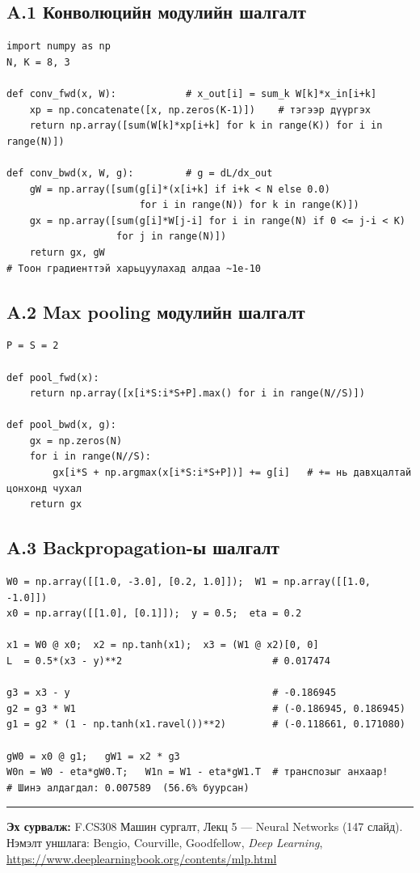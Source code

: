 \documentclass[11pt]{article}
\newenvironment{codebox}
  {\begin{mdframed}[backgroundcolor=gray!8,linewidth=0.4pt]\footnotesize}
  {\end{mdframed}}
\begin{document}
\subsection*{A.1 Конволюцийн модулийн шалгалт}
\begin{codebox}\begin{verbatim}
import numpy as np
N, K = 8, 3

def conv_fwd(x, W):            # x_out[i] = sum_k W[k]*x_in[i+k]
    xp = np.concatenate([x, np.zeros(K-1)])    # тэгээр дүүргэх
    return np.array([sum(W[k]*xp[i+k] for k in range(K)) for i in range(N)])

def conv_bwd(x, W, g):         # g = dL/dx_out
    gW = np.array([sum(g[i]*(x[i+k] if i+k < N else 0.0)
                       for i in range(N)) for k in range(K)])
    gx = np.array([sum(g[i]*W[j-i] for i in range(N) if 0 <= j-i < K)
                   for j in range(N)])
    return gx, gW
# Тоон градиенттэй харьцуулахад алдаа ~1e-10
\end{verbatim}\end{codebox}

\subsection*{A.2 Max pooling модулийн шалгалт}
\begin{codebox}\begin{verbatim}
P = S = 2

def pool_fwd(x):
    return np.array([x[i*S:i*S+P].max() for i in range(N//S)])

def pool_bwd(x, g):
    gx = np.zeros(N)
    for i in range(N//S):
        gx[i*S + np.argmax(x[i*S:i*S+P])] += g[i]   # += нь давхцалтай цонхонд чухал
    return gx
\end{verbatim}\end{codebox}

\subsection*{A.3 Backpropagation-ы шалгалт}
\begin{codebox}\begin{verbatim}
W0 = np.array([[1.0, -3.0], [0.2, 1.0]]);  W1 = np.array([[1.0, -1.0]])
x0 = np.array([[1.0], [0.1]]);  y = 0.5;  eta = 0.2

x1 = W0 @ x0;  x2 = np.tanh(x1);  x3 = (W1 @ x2)[0, 0]
L  = 0.5*(x3 - y)**2                          # 0.017474

g3 = x3 - y                                   # -0.186945
g2 = g3 * W1                                  # (-0.186945, 0.186945)
g1 = g2 * (1 - np.tanh(x1.ravel())**2)        # (-0.118661, 0.171080)

gW0 = x0 @ g1;   gW1 = x2 * g3
W0n = W0 - eta*gW0.T;   W1n = W1 - eta*gW1.T  # транспозыг анхаар!
# Шинэ алдагдал: 0.007589  (56.6% буурсан)
\end{verbatim}\end{codebox}

\vfill
\hrule
\smallskip
\noindent\footnotesize
\textbf{Эх сурвалж:} F.CS308 Машин сургалт, Лекц 5 — Neural Networks (147 слайд).
Нэмэлт уншлага: Bengio, Courville, Goodfellow, \emph{Deep Learning},
\url{https://www.deeplearningbook.org/contents/mlp.html}
\end{document}
